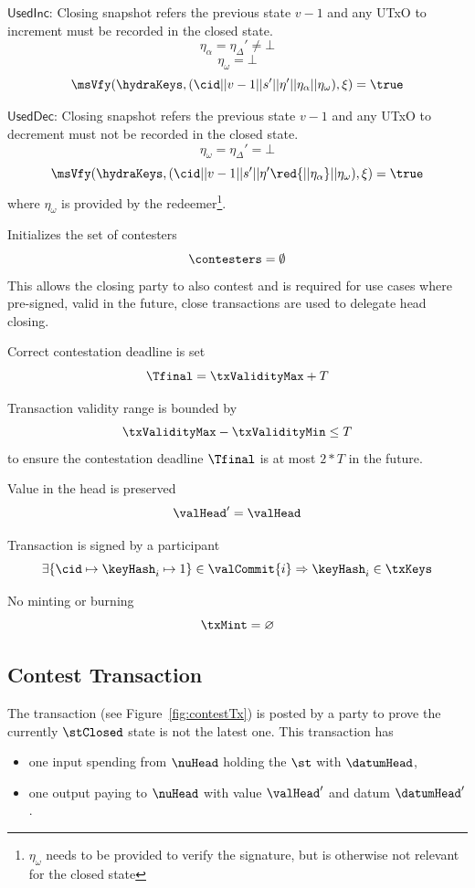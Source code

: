 \begin{menumerate}
\begin{menumerate}
{	  \item $\mathsf{UsedInc}$: Closing snapshot refers the previous state $v - 1$ and any UTxO to increment must be recorded in the closed state.
	  \[
		\eta_\alpha = \eta_\Delta' \neq \bot
	  \]
	  \[
		\eta_\omega = \bot
	  \]
	  \[
		\msVfy(\hydraKeys,(\cid || v - 1 || s' || \eta' || \eta_\alpha || \eta_\omega ),\xi) = \true
	  \]
	}
	\item $\mathsf{UsedDec}$: Closing snapshot refers the previous state $v - 1$ and any UTxO to decrement must not be recorded in the closed state.
	\[
	  \eta_\omega = \eta_\Delta' = \bot
	\]
	\red{
	  \[
		\eta_\alpha = \bot
	  \]
	}
	\[
	  \msVfy(\hydraKeys,(\cid || v - 1 || s' || \eta' \red{|| \eta_\alpha} || \eta_\omega),\xi) = \true
	\]
	where $\eta_\omega$ is provided by the redeemer\footnote{$\eta_\omega$ needs to be provided to verify the signature, but is otherwise not relevant for the closed state}.
  \end{menumerate}

  \item Initializes the set of contesters
  \[
	\contesters = \emptyset
  \]
  This allows the closing party to also contest and is required for use
  cases where pre-signed, valid in the future, close transactions are
  used to delegate head closing.

  \item Correct contestation deadline is set
  \[
	\Tfinal = \txValidityMax + T
  \]
  \item Transaction validity range is bounded by
  \[
	\txValidityMax - \txValidityMin \leq T
  \]
  to ensure the contestation deadline $\Tfinal$ is at most $2*T$ in the future.
  \item Value in the head is preserved
  \[
	\valHead' = \valHead
  \]
  \item Transaction is signed by a participant
  \[
	\exists \{\cid \mapsto \keyHash_{i} \mapsto 1\} \in \valCommit{i} \Rightarrow \keyHash_{i} \in \txKeys
  \]
  \item No minting or burning
  \[
	\txMint = \varnothing
  \]
\end{menumerate}

\subsection{Contest Transaction}\label{sec:contest-tx}

The \mtxContest{} transaction (see Figure~\ref{fig:contestTx}) is posted by a
party to prove the currently $\stClosed$ state is not the latest one. This
transaction has
\begin{itemize}
  \item one input spending from $\nuHead$ holding the $\st$ with $\datumHead$,
  \item one output paying to $\nuHead$ with value $\valHead'$ and
  datum $\datumHead'$.
\end{itemize}

